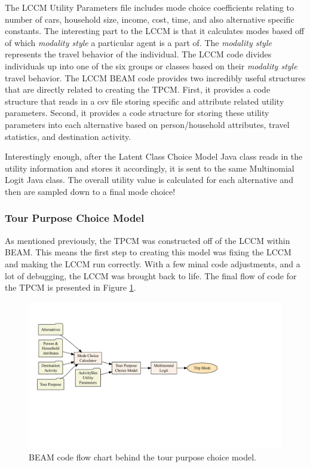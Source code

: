 \documentclass[12pt, oneside, openright]{byuthesis}
\begin{document}
The LCCM Utility Parameters file includes mode choice coefficients relating to number of cars, household size, income, cost, time, and also alternative specific constants. The interesting part to the LCCM is that it calculates modes based off of which \emph{modality style} a particular agent is a part of. The \emph{modality style} represents the travel behavior of the individual. The LCCM code divides individuals up into one of the six groups or classes based on their \emph{modality style} travel behavior. The LCCM BEAM code provides two incredibly useful structures that are directly related to creating the TPCM. First, it provides a code structure that reads in a csv file storing specific and attribute related utility parameters. Second, it provides a code structure for storing these utility parameters into each alternative based on person/household attributes, travel statistics, and destination activity.

Interestingly enough, after the Latent Class Choice Model Java class reads in the utility information and stores it accordingly, it is sent to the same Multinomial Logit Java class. The overall utility value is calculated for each alternative and then are sampled down to a final mode choice!

\hypertarget{tour-purpose-choice-model}{%
\subsubsection{Tour Purpose Choice Model}\label{tour-purpose-choice-model}}

As mentioned previously, the TPCM was constructed off of the LCCM within BEAM. This means the first step to creating this model was fixing the LCCM and making the LCCM run correctly. With a few minal code adjustments, and a lot of debugging, the LCCM was brought back to life. The final flow of code for the TPCM is presented in Figure \ref{fig:tpcmflow}.

\begin{figure}

{\centering \includegraphics[width=650px]{thesis_files/figure-latex/tpcmflow-1} 

}

\caption{BEAM code flow chart behind the tour purpose choice model.}\label{fig:tpcmflow}
\end{figure}
\end{document}
